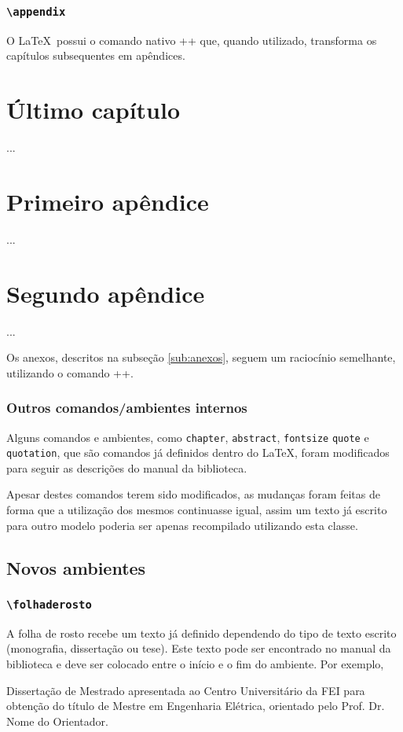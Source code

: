 \documentclass[xindy,draft]{fei}
\begin{document}
	\subsection{\texttt{\textbackslash appendix}}
	
	O \LaTeX\ possui o comando nativo \latexinline+\appendix+ que, quando utilizado, transforma os capítulos subsequentes em apêndices.
	
	\begin{latexcode}
	\chapter{Último capítulo}
	...
	\appendix
	\chapter{Primeiro apêndice}
	...
	\chapter{Segundo apêndice}
	...
	\end{latexcode}
	
	Os anexos, descritos na subseção \ref{sub:anexos}, seguem um raciocínio semelhante, utilizando o comando \latexinline+\anexos+.
    
    \subsection{Outros comandos/ambientes internos}
    
    Alguns comandos e ambientes, como \texttt{chapter}, \texttt{abstract}, \texttt{fontsize} \texttt{quote} e \texttt{quotation}, que são comandos já definidos dentro do \LaTeX, foram modificados para seguir as descrições do manual da biblioteca.

    Apesar destes comandos terem sido modificados, as mudanças foram feitas de forma que a utilização dos mesmos continuasse igual, assim um texto já escrito para outro modelo poderia ser apenas recompilado utilizando esta classe.

\section{Novos ambientes}

    \subsection{\texttt{\textbackslash folhaderosto}}
    A folha de rosto recebe um texto já definido dependendo do tipo de texto escrito (monografia, dissertação ou tese). Este texto pode ser encontrado no manual da biblioteca e deve ser colocado entre o início e o fim do ambiente. Por exemplo,
    \begin{latexcode}
\begin{folhaderosto}
Dissertação de Mestrado apresentada ao Centro Universitário
da FEI para obtenção do título de Mestre em Engenharia
Elétrica, orientado pelo Prof. Dr. Nome do Orientador. 
\end{folhaderosto}
    \end{latexcode}
\end{document}
